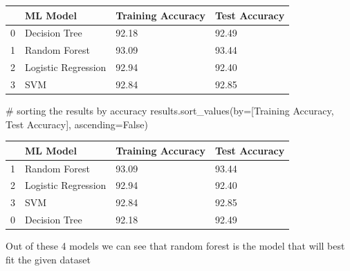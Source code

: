 \documentclass[
  letterpaper,
  DIV=11,
  numbers=noendperiod]{scrartcl}
\newenvironment{Shaded}{\begin{snugshade}}{\end{snugshade}}
\newcommand{\CommentTok}[1]{\textcolor[rgb]{0.37,0.37,0.37}{#1}}
\newcommand{\NormalTok}[1]{\textcolor[rgb]{0.00,0.23,0.31}{#1}}
\newcommand{\OperatorTok}[1]{\textcolor[rgb]{0.37,0.37,0.37}{#1}}
\newcommand{\StringTok}[1]{\textcolor[rgb]{0.13,0.47,0.30}{#1}}
\newcommand{\VariableTok}[1]{\textcolor[rgb]{0.07,0.07,0.07}{#1}}
\begin{document}
\begin{longtable}[]{@{}llll@{}}
\toprule()
& ML Model & Training Accuracy & Test Accuracy \\
\midrule()
\endhead
0 & Decision Tree & 92.18 & 92.49 \\
1 & Random Forest & 93.09 & 93.44 \\
2 & Logistic Regression & 92.94 & 92.40 \\
3 & SVM & 92.84 & 92.85 \\
\bottomrule()
\end{longtable}

\begin{Shaded}
\begin{Highlighting}[]
\CommentTok{\# sorting the results by accuracy}
\NormalTok{results.sort\_values(by}\OperatorTok{=}\NormalTok{[}\StringTok{\textquotesingle{}Training Accuracy\textquotesingle{}}\NormalTok{, }\StringTok{\textquotesingle{}Test Accuracy\textquotesingle{}}\NormalTok{], ascending}\OperatorTok{=}\VariableTok{False}\NormalTok{)}
\end{Highlighting}
\end{Shaded}

\begin{longtable}[]{@{}llll@{}}
\toprule()
& ML Model & Training Accuracy & Test Accuracy \\
\midrule()
\endhead
1 & Random Forest & 93.09 & 93.44 \\
2 & Logistic Regression & 92.94 & 92.40 \\
3 & SVM & 92.84 & 92.85 \\
0 & Decision Tree & 92.18 & 92.49 \\
\bottomrule()
\end{longtable}

Out of these 4 models we can see that random forest is the model that
will best fit the given dataset
\end{document}
